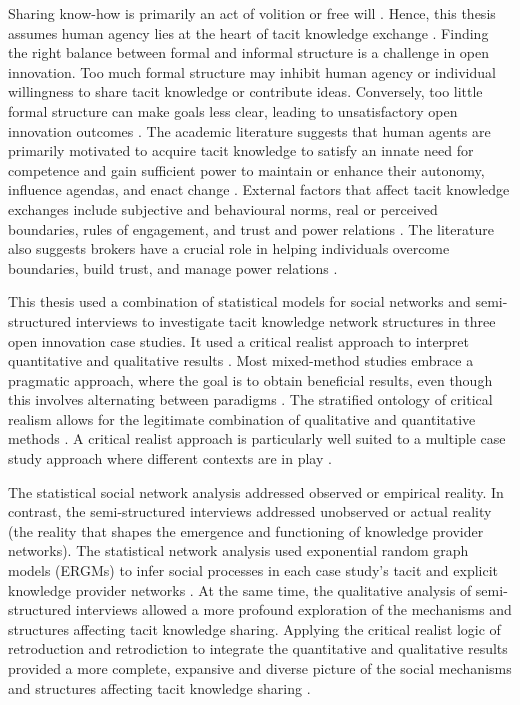 Sharing know-how is primarily an act of volition or free will \citep{polanyi1966tacit,hubrich2015embodiment,zhang2016critical}. Hence, this thesis assumes human agency lies at the heart of tacit knowledge exchange \citep{phelps2012knowledge}. Finding the right balance between formal and informal structure is a challenge in open innovation. Too much formal structure may inhibit human agency or individual willingness to share tacit knowledge or contribute ideas. Conversely, too little formal structure can make goals less clear, leading to unsatisfactory open innovation outcomes \citep{davis2010agency,nunes2020managing}. The academic literature suggests that human agents are primarily motivated to acquire tacit knowledge to satisfy an innate need for competence and gain sufficient power to maintain or enhance their autonomy, influence agendas, and enact change \citep{white1959motivation,bandura1977self,deci1989self}. External factors that affect tacit knowledge exchanges include subjective and behavioural norms, real or perceived boundaries, rules of engagement, and trust and power relations \citep{parsons1937structure,loyal2001agency}. The literature also suggests brokers have a crucial role in helping individuals overcome boundaries, build trust, and manage power relations \citep{obstfeld2014brokerage,quintane2016brokers}. \medskip

This thesis used a combination of statistical models for social networks and semi-structured interviews to investigate tacit knowledge network structures in three open innovation case studies. It used a critical realist approach to interpret quantitative and qualitative results \citep{bhaskar2013realist}. Most mixed-method studies embrace a pragmatic approach, where the goal is to obtain beneficial results, even though this involves alternating between paradigms \citep{creswell2011designing}. The stratified ontology of critical realism allows for the legitimate combination of qualitative and quantitative methods \citep{giddings2006mixed,mcevoy2006critical,mcavoy2018critical}. A critical realist approach is particularly well suited to a multiple case study approach where different contexts are in play \citep{welch2011theorising}. \medskip

The statistical social network analysis addressed observed or empirical reality. In contrast, the semi-structured interviews addressed unobserved or actual reality (the reality that shapes the emergence and functioning of knowledge provider networks). The statistical network analysis used exponential random graph models (ERGMs) to infer social processes in each case study's tacit and explicit knowledge provider networks \citep{robins2007introduction,lusher2013exponential}. At the same time, the qualitative analysis of semi-structured interviews allowed a more profound exploration of the mechanisms and structures affecting tacit knowledge sharing. Applying the critical realist logic of retroduction and retrodiction to integrate the quantitative and qualitative results provided a more complete, expansive and diverse picture of the social mechanisms and structures affecting tacit knowledge sharing \citep{zachariadis2013methodological,mcavoy2018critical}. \medskip

